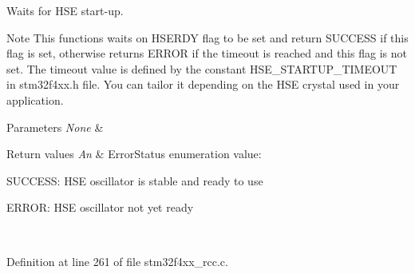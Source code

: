 Waits for H\-S\-E start-\/up. 

\begin{DoxyNote}{Note}
This functions waits on H\-S\-E\-R\-D\-Y flag to be set and return S\-U\-C\-C\-E\-S\-S if this flag is set, otherwise returns E\-R\-R\-O\-R if the timeout is reached and this flag is not set. The timeout value is defined by the constant H\-S\-E\-\_\-\-S\-T\-A\-R\-T\-U\-P\-\_\-\-T\-I\-M\-E\-O\-U\-T in stm32f4xx.\-h file. You can tailor it depending on the H\-S\-E crystal used in your application. 
\end{DoxyNote}

\begin{DoxyParams}{Parameters}
{\em None} & \\
\hline
\end{DoxyParams}

\begin{DoxyRetVals}{Return values}
{\em An} & Error\-Status enumeration value\-:
\begin{DoxyItemize}
\item S\-U\-C\-C\-E\-S\-S\-: H\-S\-E oscillator is stable and ready to use
\item E\-R\-R\-O\-R\-: H\-S\-E oscillator not yet ready 
\end{DoxyItemize}\\
\hline
\end{DoxyRetVals}


Definition at line 261 of file stm32f4xx\-\_\-rcc.\-c.

